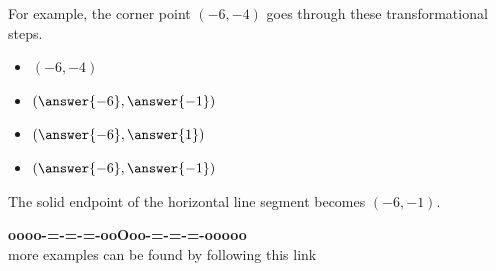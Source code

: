 \documentclass{ximera}
\begin{document}
\begin{procedure}
For example, the corner point $(-6, -4)$ goes through these transformational steps.

\begin{itemize}
\item $(-6, -4)$
\item $\left( \answer{-6},  \answer{-1} \right)$
\item $\left( \answer{-6},  \answer{1} \right)$
\item $\left( \answer{-6},  \answer{-1} \right)$
\end{itemize}

The solid endpoint of the horizontal line segment becomes $(-6, -1)$.
\end{procedure}


































\begin{onlineOnly}
\begin{center}
\textbf{\textcolor{green!50!black}{oooo-=-=-=-ooOoo-=-=-=-ooooo}} \\

more examples can be found by following this link\\ 

\end{center}
\end{onlineOnly}
\end{document}
